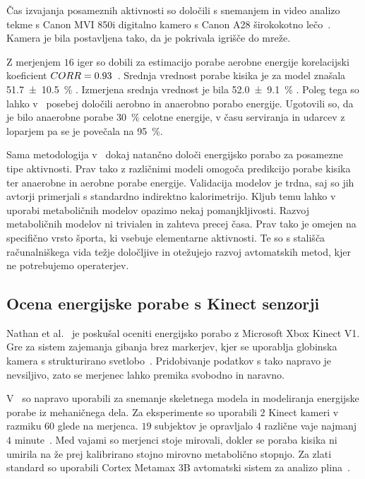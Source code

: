 Čas izvajanja posameznih aktivnosti so določili s snemanjem in video analizo tekme s Canon MVI 850i digitalno kamero s Canon A28 širokokotno lečo~\cite{botton2011energy}. Kamera je bila postavljena %
tako, da je pokrivala igrišče do mreže. 

Z merjenjem $16$ iger so dobili za estimacijo porabe aerobne energije korelacijski koeficient ${CORR} = 0.93$~\cite{botton2011energy}. Srednja vrednost porabe kisika je za model znašala \SI{51.7 \pm 10.5}{\%} \vomax. Izmerjena srednja vrednost je bila \SI{52.0 \pm 9.1}{\%} \vomax. Poleg tega so lahko 
v~\cite{botton2011energy} posebej določili aerobno in anaerobno porabo energije. Ugotovili so, da je bilo anaerobne porabe \SI{30}{\%} celotne energije, v času serviranja in udarcev z loparjem pa se je povečala na \SI{95}{\%}.  

Sama metodologija v~\cite{botton2011energy} dokaj natančno določi energijsko porabo za posamezne tipe aktivnosti. Prav tako z različnimi modeli omogoča predikcijo porabe kisika ter anaerobne in aerobne porabe energije. Validacija modelov je trdna, saj so jih avtorji primerjali s standardno indirektno kalorimetrijo. Kljub temu lahko v uporabi metaboličnih modelov opazimo nekaj pomanjkljivosti. Razvoj metaboličnih modelov ni trivialen in zahteva precej časa. Prav tako je omejen na specifično vrsto športa, ki vsebuje elementarne aktivnosti. Te so s stališča računalniškega vida težje določljive in otežujejo razvoj avtomatskih metod, kjer ne potrebujemo operaterjev.




\subsection{Ocena energijske porabe s Kinect senzorji}

Nathan et al.~\cite{nathan2015estimating} je poskušal oceniti energijsko porabo z Microsoft Xbox Kinect V1. Gre za sistem zajemanja gibanja brez markerjev, kjer se uporablja globinska kamera s strukturirano svetlobo~\cite{nathan2015estimating}. Pridobivanje podatkov s tako napravo je nevsiljivo, zato se merjenec lahko premika svobodno in naravno. 

V~\cite{nathan2015estimating} so napravo uporabili za snemanje skeletnega modela in modeliranja energijske porabe iz mehaničnega dela. Za eksperimente so uporabili $2$ Kinect kameri v razmiku \SI{60}{\stopinj} glede na merjenca. $19$ subjektov je opravljalo $4$ različne vaje najmanj $4$ minute~\cite{nathan2015estimating}. Med vajami so merjenci stoje mirovali, dokler se poraba kisika ni umirila na že prej kalibrirano stojno mirovno metabolično stopnjo. Za zlati standard so uporabili Cortex Metamax 3B avtomatski sistem za analizo plina~\cite{nathan2015estimating}.

